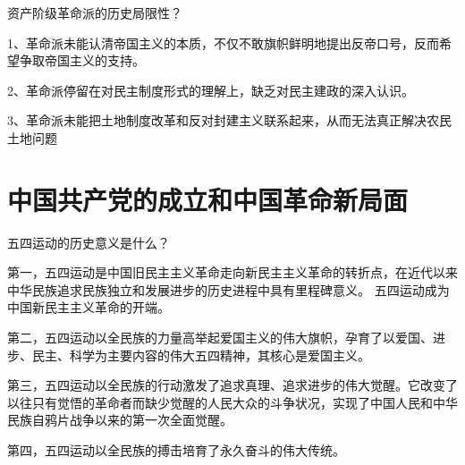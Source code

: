 \documentclass[lang=cn,10pt]{elegantbook}
\begin{document}
	\begin{example}
		资产阶级革命派的历史局限性？
	\end{example}
	\begin{solution}
		
		1、革命派未能认清帝国主义的本质，不仅不敢旗帜鲜明地提出反帝口号，反而希望争取帝国主义的支持。
		
		2、革命派停留在对民主制度形式的理解上，缺乏对民主建政的深入认识。
		
		3、革命派未能把土地制度改革和反对封建主义联系起来，从而无法真正解决农民土地问题
	\end{solution}
	\chapter{中国共产党的成立和中国革命新局面}
	\begin{example}
		五四运动的历史意义是什么？
	\end{example}
	\begin{solution}
		
		第一，五四运动是中国旧民主主义革命走向新民主主义革命的转折点，在近代以来中华民族追求民族独立和发展进步的历史进程中具有里程碑意义。 五四运动成为中国新民主主义革命的开端。
		
		第二，五四运动以全民族的力量高举起爱国主义的伟大旗帜，孕育了以爱国、进步、民主、科学为主要内容的伟大五四精神，其核心是爱国主义。 
		
		第三，五四运动以全民族的行动激发了追求真理、追求进步的伟大觉醒。它改变了以往只有觉悟的革命者而缺少觉醒的人民大众的斗争状况，实现了中国人民和中华民族自鸦片战争以来的第一次全面觉醒。 
		
		第四，五四运动以全民族的搏击培育了永久奋斗的伟大传统。
	\end{solution}
	
\end{document}
